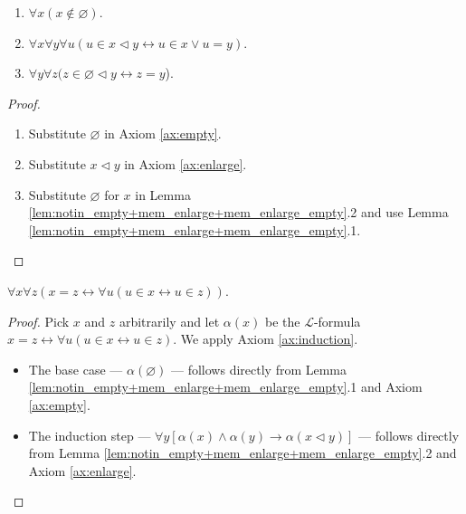 \begin{lemma}
    \label{lem:notin_empty+mem_enlarge+mem_enlarge_empty}
    \leanok
    \leavevmode
    \begin{enumerate}
        \item $\forall x (x\notin \varnothing)$.
        \item $\forall x \forall y \forall u (u \in x \lhd y \leftrightarrow u \in x \lor u=y)$.
        \item $\forall y \forall z (z\in \varnothing \lhd y \leftrightarrow z = y$).
    \end{enumerate}
\end{lemma}

\begin{proof}
    \leanok
    \leavevmode
    \begin{enumerate}
        \item Substitute $\varnothing$ in Axiom \ref{ax:empty}.
        \item Substitute $x \lhd y$ in Axiom \ref{ax:enlarge}.
        \item Substitute $\varnothing$ for $x$ in Lemma 
        \ref{lem:notin_empty+mem_enlarge+mem_enlarge_empty}.2 and use Lemma 
        \ref{lem:notin_empty+mem_enlarge+mem_enlarge_empty}.1.
    \end{enumerate}
\end{proof}

\begin{theorem}
    \label{thm:exten_prop}
    \leanok
    $\forall x \forall z (x=z \leftrightarrow \forall u (u \in x \leftrightarrow u \in z))$.
\end{theorem}

\begin{proof}
    \leanok
    Pick $x$ and $z$ arbitrarily and let $\alpha (x)$ be the $\mathcal{L}$-formula
    $x=z \leftrightarrow \forall u (u \in x \leftrightarrow u \in z)$.
    We apply Axiom \ref{ax:induction}.
    \begin{itemize}
        \item The base case — $\alpha (\varnothing)$ — follows directly from Lemma 
        \ref{lem:notin_empty+mem_enlarge+mem_enlarge_empty}.1 and Axiom \ref{ax:empty}.
        \item The induction step — 
        $\forall y[\alpha(x) \land \alpha(y) \rightarrow \alpha(x \lhd y)]$ — 
        follows directly from Lemma \ref{lem:notin_empty+mem_enlarge+mem_enlarge_empty}.2 and 
        Axiom \ref{ax:enlarge}.
    \end{itemize}
\end{proof}

